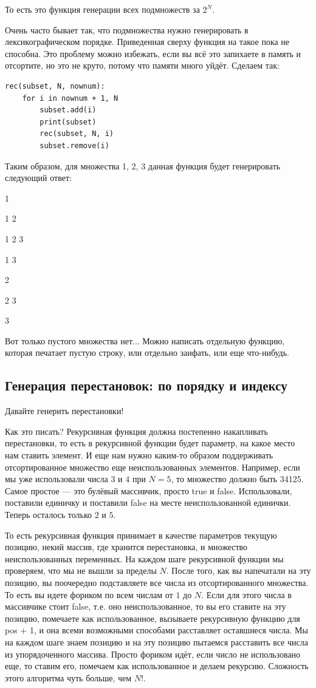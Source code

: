 \documentclass[12pt]{article}
\begin{document}
То есть это функция генерации всех подмножеств за $2^N$. 

Очень часто бывает так, что подмножества нужно генерировать в лексикографическом порядке. Приведенная сверху функция на такое пока не способна. Это проблему можно избежать, если вы всё это запихаете в память и отсортите, но это не круто, потому что памяти много уйдёт. Сделаем так: 
\begin{verbatim}
rec(subset, N, nownum):
    for i in nownum + 1, N
        subset.add(i)
        print(subset)
        rec(subset, N, i)
        subset.remove(i)
\end{verbatim}

Таким образом, для множества {1, 2, 3} данная функция будет генерировать следующий ответ:

1

1 2

1 2 3

1 3

2

2 3

3

Вот только пустого множества нет... Можно написать отдельную функцию, которая печатает пустую строку, или отдельно заифать, или еще что-нибудь. 

\subsection*{Генерация перестановок: по порядку и индексу}
Давайте генерить перестановки!

Как это писать? Рекурсивная функция должна постепенно накапливать перестановки, то есть в рекурсивной функции будет параметр, на какое место нам ставить элемент. И еще нам нужно каким-то образом поддерживать отсортированное множество еще неиспользованных элементов. Например, если мы уже использовали числа $3$ и $4$ при $N=5$, то множество должно быть 34125. Самое простое --- это булёвый массивчик, просто true и false. Использовали, поставили единичку и поставили false на месте неиспользованной единички. Теперь осталось только $2$ и $5$. 

То есть рекурсивная функция принимает в качестве параметров текущую позицию, некий массив, где хранится перестановка, и множество неиспользованных переменных. На каждом шаге рекурсивной функции мы проверяем, что мы не вышли за пределы $N$. После того, как вы напечатали на эту позицию, вы поочередно подставляете все числа из отсортированного множества. То есть вы идете фориком по всем числам от $1$ до $N$. Если для этого числа в массивчике стоит false, т.е. оно неиспользованное, то вы его ставите на эту позицию, помечаете как использованное, вызываете рекурсивную функцию для pos + 1, и она всеми возможными способами расставляет оставшиеся числа. Мы на каждом шаге знаем позицию и на эту позицию пытаемся расставить все числа из упорядоченного массива. Просто фориком идёт, если число не использовано еще, то ставим его, помечаем как использованное и делаем рекурсию. Сложность этого алгоритма чуть больше, чем $N!$. 
\end{document}
